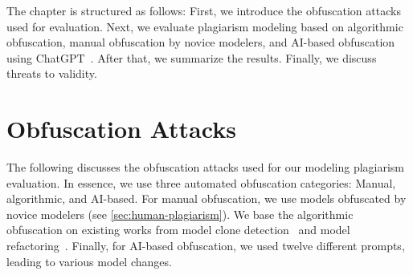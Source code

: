 The chapter is structured as follows: First, we introduce the obfuscation attacks used for evaluation. Next, we evaluate plagiarism modeling based on algorithmic obfuscation, manual obfuscation by novice modelers, and AI-based obfuscation using ChatGPT~\cite{ChatGPT}. After that, we summarize the results. Finally, we discuss threats to validity.


\section{Obfuscation Attacks}
The following discusses the obfuscation attacks used for our modeling plagiarism evaluation.
In essence, we use three automated obfuscation categories: Manual, algorithmic, and AI-based. For manual obfuscation, we use models obfuscated by novice modelers (see \autoref{sec:human-plagiarism}).
We base the algorithmic obfuscation on existing works from model clone detection~\cite{Babur2019} and model refactoring~\cite{Bettini2022, Sidhu2018, Stoerrle2015}.
Finally, for AI-based obfuscation, we used twelve different prompts, leading to various model changes.

